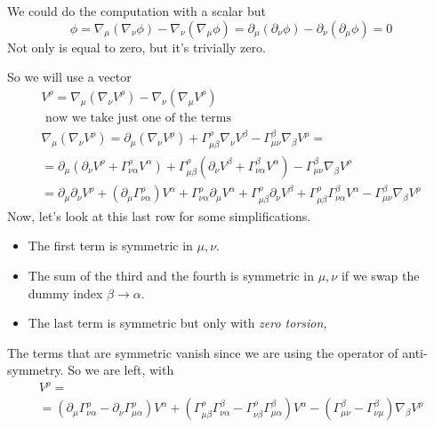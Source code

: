 We could do the computation with a scalar but
\begin{equation}
	[\nabla _{\mu }, \nabla _{\nu }] \phi = \nabla _{\mu}\left( \nabla _{\nu }\phi  \right) -\nabla _{\nu }\left( \nabla _{\mu }\phi  \right) = \partial_{\mu }\left( \partial_{\nu }\phi  \right) - \partial_{\nu }\left( \partial_{\mu }\phi  \right) = 0
\end{equation}
Not only is equal to zero, but it's trivially zero.\par
So we will use a vector
\begin{gather*}
	[\nabla _{\mu },\nabla _{\nu }] V^{\rho } = \nabla _{\mu }\left( \nabla _{\nu }V^{\rho } \right) - \nabla_{\nu }\left( \nabla _{\mu }V^{\rho } \right)	 \\
	\text{ now we take just one of the terms } \\
	\nabla _{\mu }\left( \nabla _{\nu } V^{\rho } \right) = \partial_{\mu } \left( \nabla _{\nu } V^{\rho } \right) + \Gamma ^{\rho }_{\mu \beta } \nabla _{\nu }V^{\beta } - \Gamma ^{\beta }_{\mu \nu } \nabla _{\beta } V^{\rho } =\\
	=\partial_{\mu }\left( \partial_{\nu }V^{\rho } + \Gamma ^{\rho }_{\nu \alpha } V^{\alpha } \right) + \Gamma ^{\rho }_{\mu \beta } \left( \partial_{\nu }V^{\beta } + \Gamma ^{\beta}_{\nu \alpha } V^{\alpha } \right) - \Gamma ^{\beta }_{\mu \nu } \nabla _{\beta }V^{\rho } \\
	=\partial_{\mu }\partial_{\nu }V^{\rho } + \left( \partial_{\mu } \Gamma ^{\rho }_{\nu \alpha } \right)V^{\alpha } + \Gamma ^{\rho }_{\nu \alpha } \partial_{\mu }V^{\alpha } + \Gamma ^{\rho }_{\mu \beta } \partial_{\nu }V^{\beta } + \Gamma ^{\rho }_{\mu \beta }\Gamma ^{\beta }_{\nu \alpha } V^{\alpha }- \Gamma ^{\beta }_{\mu \nu }\nabla _{\beta} V^{\rho }
\end{gather*}
Now, let's look at this last row for some simplifications.
\begin{itemize}
\item The first term is symmetric in $\mu , \nu $.
\item The sum of the third and the fourth is symmetric in $\mu , \nu $ if we swap the dummy index $\beta \to \alpha $.
\item The last term is symmetric but only with \emph{zero torsion,}
\end{itemize}
The terms that are symmetric vanish since we are using the operator of anti-symmetry. So we are left, with
\begin{gather}
	[\nabla _{\mu }, \nabla _{\nu }]V^{\rho } =\\
	= \left( \partial_{\mu }\Gamma ^{\rho }_{\nu \alpha } - \partial_{\nu }\Gamma ^{\rho }_{\mu \alpha } \right)V^{\alpha } + \left( \Gamma ^{\rho }_{\mu \beta } \Gamma ^{\beta }_{\nu \alpha } - \Gamma ^{\rho }_{\nu \beta }\Gamma ^{\beta }_{\mu \alpha } \right)V^{\alpha } - \left( \Gamma ^{\beta }_{\mu \nu } - \Gamma ^{\beta }_{\nu \mu } \right)\nabla _{\beta }V^{\rho }
\end{gather}
